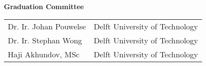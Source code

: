\noindent \textbf{Graduation Committee}\\
\begin{tabular}{ll}
  Dr. Ir. Johan Pouwelse & Delft University of Technology \\
  Dr. Ir. Stephan Wong & Delft University of Technology \\
  Haji Akhundov, MSc & Delft University of Technology \\

\end{tabular}


\begin{abstract} %
\reportAbstract
\end{abstract}

\clearpage
